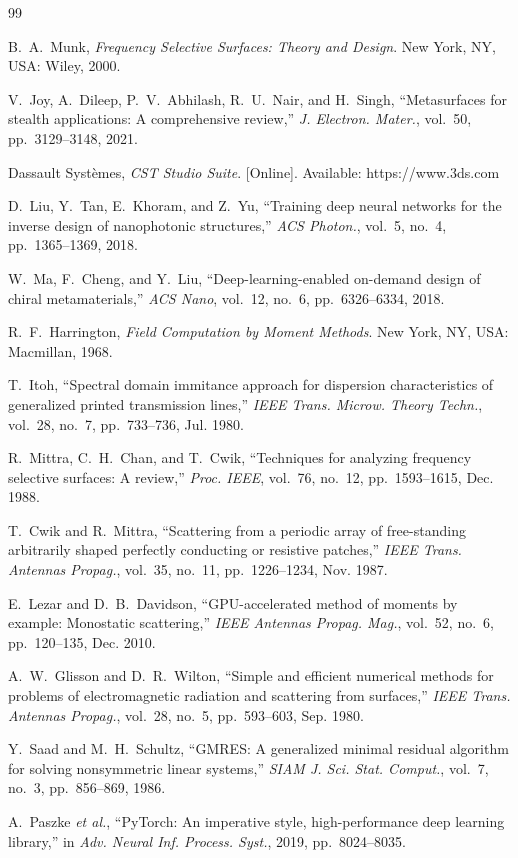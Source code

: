 \documentclass[10pt,conference]{IEEEtran}
\begin{document}
	\balance
	\begin{thebibliography}{99}
		
		B.~A.~Munk, \emph{Frequency Selective Surfaces: Theory and Design}.
		New York, NY, USA: Wiley, 2000.
		
		V.~Joy, A.~Dileep, P.~V.~Abhilash, R.~U.~Nair, and H.~Singh, ``Metasurfaces
		for stealth applications: A comprehensive review,'' \emph{J. Electron.
			Mater.}, vol.~50, pp.~3129--3148, 2021.
		
		Dassault Syst\`emes, \emph{CST Studio Suite}. [Online]. Available:
		https://www.3ds.com
		
		D.~Liu, Y.~Tan, E.~Khoram, and Z.~Yu, ``Training deep neural networks for the
		inverse design of nanophotonic structures,'' \emph{ACS Photon.}, vol.~5,
		no.~4, pp.~1365--1369, 2018.
		
		W.~Ma, F.~Cheng, and Y.~Liu, ``Deep-learning-enabled on-demand design of
		chiral metamaterials,'' \emph{ACS Nano}, vol.~12, no.~6, pp.~6326--6334, 2018.
		
		R.~F.~Harrington, \emph{Field Computation by Moment Methods}.
		New York, NY, USA: Macmillan, 1968.
		
		T.~Itoh, ``Spectral domain immitance approach for dispersion characteristics
		of generalized printed transmission lines,'' \emph{IEEE Trans. Microw. Theory
			Techn.}, vol.~28, no.~7, pp.~733--736, Jul. 1980.
		
		R.~Mittra, C.~H.~Chan, and T.~Cwik, ``Techniques for analyzing frequency
		selective surfaces: A review,'' \emph{Proc. IEEE}, vol.~76, no.~12,
		pp.~1593--1615, Dec. 1988.
		
		T.~Cwik and R.~Mittra, ``Scattering from a periodic array of free-standing
		arbitrarily shaped perfectly conducting or resistive patches,'' \emph{IEEE
			Trans. Antennas Propag.}, vol.~35, no.~11, pp.~1226--1234, Nov. 1987.
		
		E.~Lezar and D.~B.~Davidson, ``GPU-accelerated method of moments by example:
		Monostatic scattering,'' \emph{IEEE Antennas Propag. Mag.}, vol.~52, no.~6,
		pp.~120--135, Dec. 2010.
		
		A.~W.~Glisson and D.~R.~Wilton, ``Simple and efficient numerical methods for
		problems of electromagnetic radiation and scattering from surfaces,''
		\emph{IEEE Trans. Antennas Propag.}, vol.~28, no.~5, pp.~593--603, Sep. 1980.
		
		Y.~Saad and M.~H.~Schultz, ``GMRES: A generalized minimal residual algorithm
		for solving nonsymmetric linear systems,'' \emph{SIAM J. Sci. Stat. Comput.},
		vol.~7, no.~3, pp.~856--869, 1986.
		
		A.~Paszke \emph{et al.}, ``PyTorch: An imperative style, high-performance deep
		learning library,'' in \emph{Adv. Neural Inf. Process. Syst.}, 2019,
		pp.~8024--8035.
		
	\end{thebibliography}
	
\end{document}
